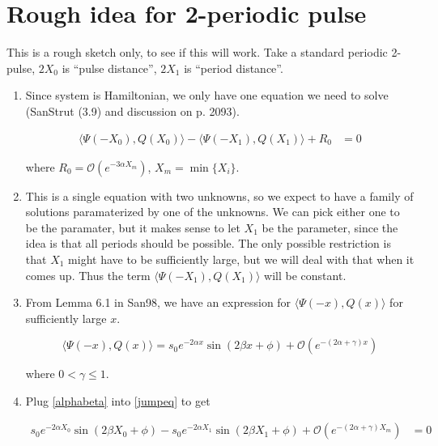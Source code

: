 \documentclass[12pt]{article}
\begin{document}
\section{Rough idea for 2-periodic pulse}

This is a rough sketch only, to see if this will work. Take a standard periodic 2-pulse, $2X_0$ is ``pulse distance'', $2X_1$ is ``period distance''.

\begin{enumerate}

\item Since system is Hamiltonian, we only have one equation we need to solve (SanStrut (3.9) and discussion on p. 2093).

\begin{align}\label{jumpeq}
\langle \Psi(-X_0), Q(X_0) \rangle - \langle \Psi(-X_1), Q(X_1) \rangle + R_0 &= 0
\end{align}

where $R_0 = \mathcal{O}(e^{-3 \alpha X_m})$, $X_m = \min\{X_i\}$.

\item This is a single equation with two unknowns, so we expect to have a family of solutions paramaterized by one of the unknowns. We can pick either one to be the paramater, but it makes sense to let $X_1$ be the parameter, since the idea is that all periods should be possible. The only possible restriction is that $X_1$ might have to be sufficiently large, but we will deal with that when it comes up. Thus the term $\langle \Psi(-X_1), Q(X_1) \rangle$ will be constant.

\item From Lemma 6.1 in San98, we have an expression for $\langle \Psi(-x), Q(x) \rangle$ for sufficiently large $x$.

\begin{equation}\label{alphabeta}
\langle \Psi(-x), Q(x) \rangle
= s_0 e^{-2 \alpha x} \sin(2 \beta x + \phi) + \mathcal{O}(e^{-(2 \alpha + \gamma) x})
\end{equation}

where $0 < \gamma \leq 1$.

\item Plug \eqref{alphabeta} into \eqref{jumpeq} to get

\begin{align}\label{jumpeq1}
s_0 e^{-2 \alpha X_0} \sin(2 \beta X_0 + \phi) - s_0 e^{-2 \alpha X_1} \sin(2 \beta X_1 + \phi) + \mathcal{O}(e^{-(2 \alpha + \gamma) X_m}) &= 0
\end{align}


\end{enumerate}
\end{document}
